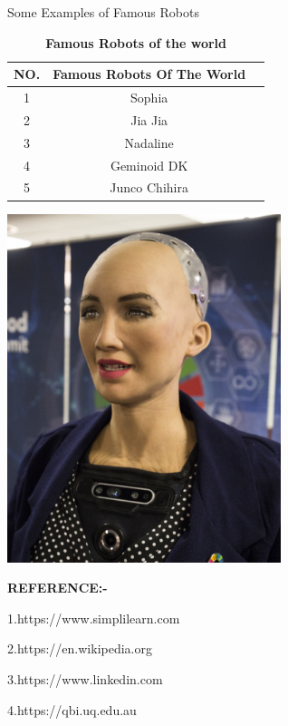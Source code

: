 \documentclass{article}
\begin{document}
\noindent
Some Examples of Famous Robots
\begin{table}[!tbh]
    \centering
        \begin{tabular}{|c|c|c}
        \hline
        \textbf{NO.} & \textbf{Famous Robots Of The World} \\
        \hline
        1 & Sophia \\
        \hline
        2 & Jia Jia \\ 
        \hline
        3 & Nadaline \\ 
        \hline
        4 & Geminoid  DK \\
        \hline
        5 & Junco Chihira \\
        \hline
        \end{tabular}
    \label{tab:1}
    \caption{\textbf{Famous Robots of the world}}
\end{table}

\includegraphics[width=8cm]{Sophia Robot.jpg}\par
\bf\large\caption{ Figure: Sophia robot}\par



\bf REFERENCE:-\par
1.https://www.simplilearn.com\par
2.https://en.wikipedia.org\par
3.https://www.linkedin.com\par
4.https://qbi.uq.edu.au\par


 
\end{document}

